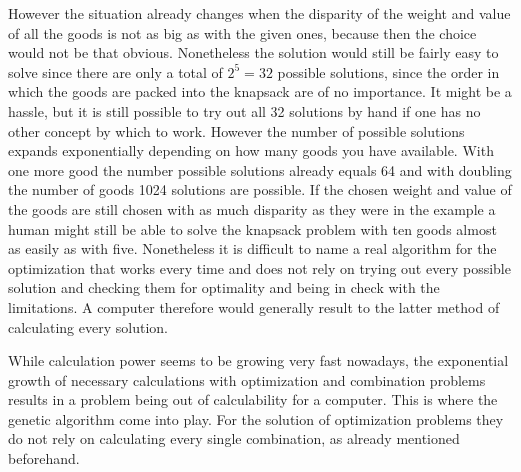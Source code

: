 \documentclass[11pt,a4paper]{article}
\begin{document}
However the situation already changes when the disparity of the weight and value of all the goods is not as big as with the given ones, because then the choice would not be that obvious. Nonetheless the solution would still be fairly easy to solve since there are only a total of $2^5=32$ possible solutions, since the order in which the goods are packed into the knapsack are of no importance. It might be a hassle, but it is still possible to try out all 32 solutions by hand if one has no other concept by which to work.
However the number of possible solutions expands exponentially depending on how many goods you have available. With one more good the number possible solutions already equals 64 and with doubling the number of goods 1024 solutions are possible. If the chosen weight and value of the goods are still chosen with as much disparity as they were in the example a human might still be able to solve the knapsack problem with ten goods almost as easily as with five.
Nonetheless it is difficult to name a real algorithm for the optimization that works every time and does not rely on trying out every possible solution and checking them for optimality and being in check with the limitations. A computer therefore would generally result to the latter method of calculating every solution.

While calculation power seems to be growing very fast nowadays, the exponential growth of necessary calculations with optimization and combination problems results in a problem being out of calculability for a computer.
This is where the genetic algorithm come into play. For the solution of optimization problems they do not rely on calculating every single combination, as already mentioned beforehand.
\end{document}
